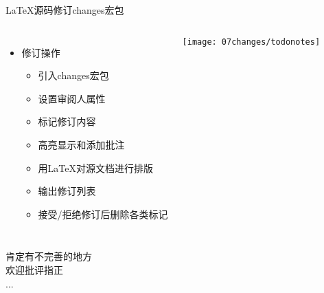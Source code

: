 \documentclass[fontset = none, t, aspectratio=169]{ctexbeamer}
\begin{document}
\begin{frame}[label=testframe]{\LaTeX 源码修订}{changes宏包}
    \begin{columns}[T]
    \begin{itemize}\itemsep=8pt
    \item 修订操作
      \begin{itemize}\itemsep=10pt
      \item 引入changes宏包
      \item 设置审阅人属性
      \item 标记修订内容
      \item 高亮显示和添加批注
      \item 用\LaTeX 对源文档进行排版
      \item 输出修订列表
      \item 接受/拒绝修订后删除各类标记
      \end{itemize}    
    \end{itemize}
    \texttt{[image: 07changes/todonotes]}
  \end{columns}
\end{frame}


\begin{frame}
  肯定有不完善的地方\\
  欢迎批评指正\\...
\end{frame}
\end{document}
